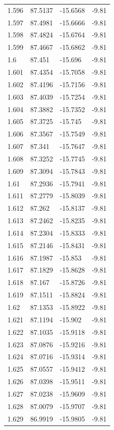 \begin{tabular}{llll}
1.596 & 87.5137 & -15.6568 & -9.81 \\
1.597 & 87.4981 & -15.6666 & -9.81 \\
1.598 & 87.4824 & -15.6764 & -9.81 \\
1.599 & 87.4667 & -15.6862 & -9.81 \\
1.6 & 87.451 & -15.696 & -9.81 \\
1.601 & 87.4354 & -15.7058 & -9.81 \\
1.602 & 87.4196 & -15.7156 & -9.81 \\
1.603 & 87.4039 & -15.7254 & -9.81 \\
1.604 & 87.3882 & -15.7352 & -9.81 \\
1.605 & 87.3725 & -15.745 & -9.81 \\
1.606 & 87.3567 & -15.7549 & -9.81 \\
1.607 & 87.341 & -15.7647 & -9.81 \\
1.608 & 87.3252 & -15.7745 & -9.81 \\
1.609 & 87.3094 & -15.7843 & -9.81 \\
1.61 & 87.2936 & -15.7941 & -9.81 \\
1.611 & 87.2779 & -15.8039 & -9.81 \\
1.612 & 87.262 & -15.8137 & -9.81 \\
1.613 & 87.2462 & -15.8235 & -9.81 \\
1.614 & 87.2304 & -15.8333 & -9.81 \\
1.615 & 87.2146 & -15.8431 & -9.81 \\
1.616 & 87.1987 & -15.853 & -9.81 \\
1.617 & 87.1829 & -15.8628 & -9.81 \\
1.618 & 87.167 & -15.8726 & -9.81 \\
1.619 & 87.1511 & -15.8824 & -9.81 \\
1.62 & 87.1353 & -15.8922 & -9.81 \\
1.621 & 87.1194 & -15.902 & -9.81 \\
1.622 & 87.1035 & -15.9118 & -9.81 \\
1.623 & 87.0876 & -15.9216 & -9.81 \\
1.624 & 87.0716 & -15.9314 & -9.81 \\
1.625 & 87.0557 & -15.9412 & -9.81 \\
1.626 & 87.0398 & -15.9511 & -9.81 \\
1.627 & 87.0238 & -15.9609 & -9.81 \\
1.628 & 87.0079 & -15.9707 & -9.81 \\
1.629 & 86.9919 & -15.9805 & -9.81 \\

\end{tabular}
